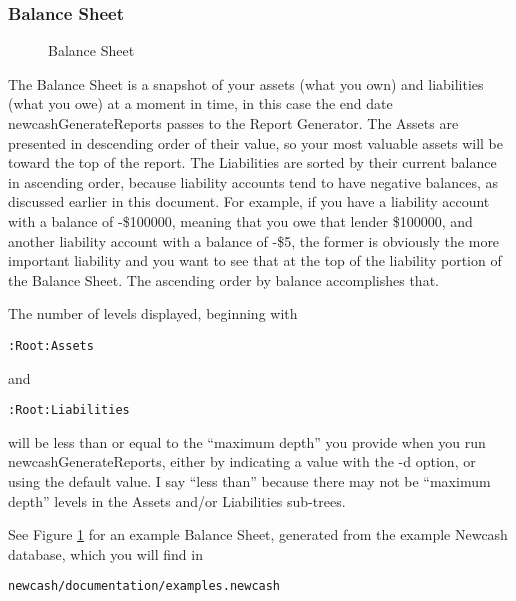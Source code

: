 \documentclass{report}
\newcommand{\graphicsfig}[5]{
\begin{figure}[#5]
\begin{center}
\resizebox{#1}{!}{\texttt{[image: \#2]}}
\end{center}
\caption{#3}
\label{#4}
\end{figure}
}
\begin{document}
\subsubsection{Balance Sheet}
\graphicsfig{5in}{figures/balance_sheet.png}{Balance Sheet}{Balance Sheet}{}
The Balance Sheet is a snapshot of your assets (what you own) and liabilities (what you owe) at a moment in time, in this case the end date newcashGenerateReports passes to the Report Generator. The Assets are presented in descending order of their value, so your most valuable assets will be toward the top of the report. The Liabilities are sorted by their current balance in ascending order, because liability accounts tend to have negative balances, as discussed earlier in this document. For example, if you have a liability account with a balance of -\$100000, meaning that you owe that lender \$100000, and another liability account with a balance of -\$5, the former is obviously the more important liability and you want to see that at the top of the liability portion of the Balance Sheet. The ascending order by balance accomplishes that.

The number of levels displayed, beginning with 
\begin{verbatim}
:Root:Assets
\end{verbatim}
and 
\begin{verbatim}
:Root:Liabilities
\end{verbatim}
will be less than or equal to the ``maximum depth'' you provide when you run newcashGenerateReports, either by indicating a value with the -d option, or using the default value. I say ``less than'' because there may not be ``maximum depth'' levels in the Assets and/or Liabilities sub-trees.

See Figure \ref{Balance Sheet} for an example Balance Sheet, generated from the example Newcash database, which you will find in 
\begin{verbatim}
newcash/documentation/examples.newcash
\end{verbatim}
\end{document}
